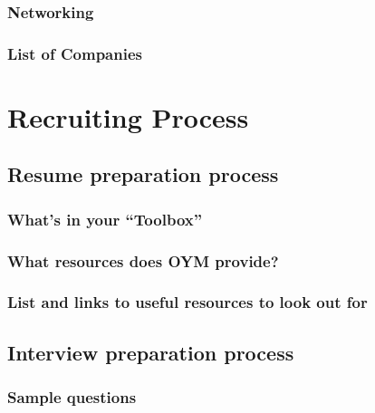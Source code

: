 \documentclass[
]{book}
\begin{document}
\hypertarget{networking}{%
\subsection{Networking}\label{networking}}

\hypertarget{list-of-companies}{%
\subsection{List of Companies}\label{list-of-companies}}

\hypertarget{recruiting-process}{%
\chapter{Recruiting Process}\label{recruiting-process}}

\hypertarget{resume-preparation-process}{%
\section{Resume preparation process}\label{resume-preparation-process}}

\hypertarget{whats-in-your-toolbox}{%
\subsection{What's in your ``Toolbox''}\label{whats-in-your-toolbox}}

\hypertarget{what-resources-does-oym-provide}{%
\subsection{What resources does OYM provide?}\label{what-resources-does-oym-provide}}

\hypertarget{list-and-links-to-useful-resources-to-look-out-for}{%
\subsection{List and links to useful resources to look out for}\label{list-and-links-to-useful-resources-to-look-out-for}}

\hypertarget{interview-preparation-process}{%
\section{Interview preparation process}\label{interview-preparation-process}}

\hypertarget{sample-questions}{%
\subsection{Sample questions}\label{sample-questions}}
\end{document}
